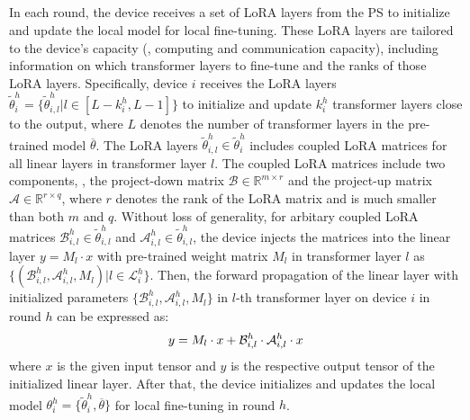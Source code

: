 \vspace{-0.3cm}
\subsection{}
\vspace{-0.2cm}
In each round, the device receives a set of LoRA layers from the PS to initialize and update the local model for local fine-tuning. 
These LoRA layers are tailored to the device's capacity (\eg, computing and communication capacity), including information on which transformer layers to fine-tune and the ranks of those LoRA layers. 
Specifically, device $i$ receives the LoRA layers $\widetilde{\theta}_i^h = \{ \widetilde{\theta}_{i, l}^h | l \in [L - {k}_i^h, L - 1] \}$ to initialize and update ${k}_i^h$ transformer layers close to the output, where $L$ denotes the number of transformer layers in the pre-trained model $\overline{\theta}$. 
The LoRA layers $\widetilde{\theta}_{i, l}^h \in \widetilde{\theta}_i^h$ includes coupled LoRA matrices for all linear layers in transformer layer $l$.
The coupled LoRA matrices include two components, \ie, the project-down matrix $\mathcal{B} \in \mathbb{R}^{m \times r}$ and the project-up matrix $\mathcal{A} \in \mathbb{R}^{r \times q}$, where $r$ denotes the rank of the LoRA matrix and is much smaller than both $m$ and $q$.
Without loss of generality, for arbitary coupled LoRA matrices $\mathcal{B}_{i,l}^{h} \in \widetilde{\theta}_{i,l}^h$ and $\mathcal{A}_{i,l}^{h} \in \widetilde{\theta}_{i,l}^h$, the device injects the matrices into the linear layer $y = M_l \cdot x$ with pre-trained weight matrix $M_l$ in transformer layer $l$ as $\{ ( \mathcal{B}_{i,l}^{h}, \mathcal{A}_{i,l}^{h}, M_l ) | l \in \mathcal{L}_i^h \}$.
Then, the forward propagation of the linear layer with initialized parameters $\{ \mathcal{B}_{i,l}^{h}, \mathcal{A}_{i,l}^{h}, M_l\}$ in $l$-th transformer layer on device $i$ in round $h$ can be expressed as: 
\vspace{-0.2cm}
\begin{equation}
    y = M_l \cdot x + \mathcal{B}_{i,l}^{h} \cdot \mathcal{A}_{i,l}^{h} \cdot x
    \vspace{-0.2cm}
\end{equation}
where $x$ is the given input tensor and $y$ is the respective output tensor of the initialized linear layer. 
After that, the device initializes and updates the local model $\theta_i^h = \{ \widetilde{\theta}_i^h, \overline{\theta} \}$ for local fine-tuning in round $h$. 
\vspace{-0.2cm}

